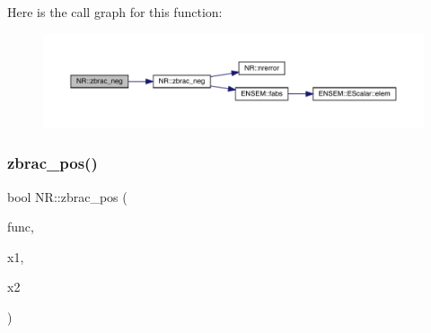 Here is the call graph for this function\+:
\nopagebreak
\begin{figure}[H]
\begin{center}
\leavevmode
\includegraphics[width=350pt]{da/d46/namespaceNR_ae680e6f764b658f8a61651eb172b4cab_cgraph}
\end{center}
\end{figure}
\mbox{\label{namespaceNR_ab8c06a4592a772cfbeed372a197e2538}} 
\subsubsection{\texorpdfstring{zbrac\_pos()}{zbrac\_pos()}\hspace{0.1cm}{\footnotesize\ttfamily [1/2]}}
{\footnotesize\ttfamily bool N\+R\+::zbrac\+\_\+pos (\begin{DoxyParamCaption}\item[{const \mbox{\hyperlink{classNR_1_1ScalFunc}{Scal\+Func}} \&}]{func,  }\item[{\mbox{\hyperlink{namespaceNR_af6ff762dd605ff477b8e52387253a02a}{DP}} \&}]{x1,  }\item[{\mbox{\hyperlink{namespaceNR_af6ff762dd605ff477b8e52387253a02a}{DP}} \&}]{x2 }\end{DoxyParamCaption})}

